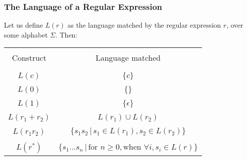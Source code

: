 \documentclass[aspectratio=169]{beamer}
\begin{document}
\begin{frame}[fragile]
  \frametitle{The Language of a Regular Expression}

  Let us define $L(r)$ as the language matched by the regular expression $r$, 
  over some alphabet $\Sigma$. Then: 

  \begin{center}
    \begin{tabular}{c || c} 
      \hline & \\[-1.5ex]
      Construct & Language matched \\ [2pt]
      \hline & \\[-1.5ex]
      \hline & \\[-1.5ex]
      $L(c)$ & $\{ c \}$ \\ [2pt]
      \hline & \\[-1.5ex]
      $L(0)$ & $\{ \}$ \\ [2pt]
      \hline & \\[-1.5ex]
      $L(1)$ & $\{ \epsilon \}$ \\ [2pt]
      \hline & \\[-1.5ex]
      $L(r_1 + r_2)$ & $L(r_1) \cup L(r_2)$ \\ [2pt]
      \hline & \\[-1.5ex]
      $L(r_1r_2)$ & $\{ s_1s_2 \, | \, s_1 \in L(r_1), s_2 \in L(r_2) \}$ \\ [2pt]
      \hline & \\[-1.5ex]
      $L(r^*)$ & $\{ s_1 ... s_n \, | \, \text{for } n \geq 0, \text{when } \forall i, s_i \in L(r) \}$ \\ [2pt]
      \hline
    \end{tabular}
  \end{center}
\end{frame}
\end{document}

